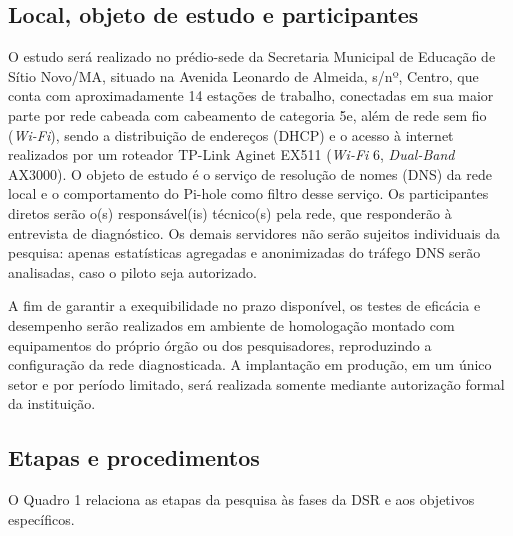\documentclass[12pt,a4paper]{article}
\begin{document}
\subsection{Local, objeto de estudo e participantes}
O estudo será realizado no prédio-sede da Secretaria Municipal de Educação de Sítio Novo/MA, situado na Avenida Leonardo de Almeida, s/nº, Centro, que conta com aproximadamente 14 estações de trabalho, conectadas em sua maior parte por rede cabeada com cabeamento de categoria 5e, além de rede sem fio (\textit{Wi-Fi}), sendo a distribuição de endereços (DHCP) e o acesso à internet realizados por um roteador TP-Link Aginet EX511 (\textit{Wi-Fi} 6, \textit{Dual-Band} AX3000). O objeto de estudo é o serviço de resolução de nomes (DNS) da rede local e o comportamento do Pi-hole como filtro desse serviço. Os participantes diretos serão o(s) responsável(is) técnico(s) pela rede, que responderão à entrevista de diagnóstico. Os demais servidores não serão sujeitos individuais da pesquisa: apenas estatísticas agregadas e anonimizadas do tráfego DNS serão analisadas, caso o piloto seja autorizado.

A fim de garantir a exequibilidade no prazo disponível, os testes de eficácia e desempenho serão realizados em ambiente de homologação montado com equipamentos do próprio órgão ou dos pesquisadores, reproduzindo a configuração da rede diagnosticada. A implantação em produção, em um único setor e por período limitado, será realizada somente mediante autorização formal da instituição.

\subsection{Etapas e procedimentos}
O Quadro 1 relaciona as etapas da pesquisa às fases da DSR e aos objetivos específicos.
\end{document}
